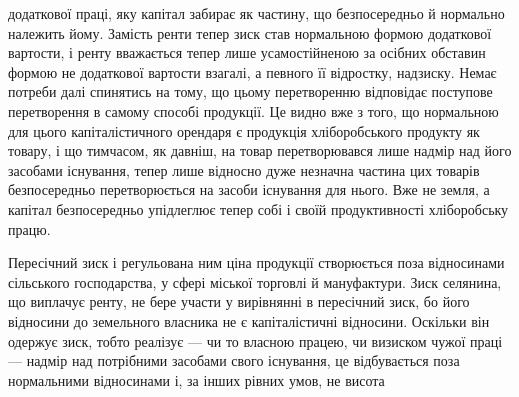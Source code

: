 додаткової праці, яку капітал забирає як частину, що безпосередньо й нормально
належить йому. Замість ренти тепер зиск став нормальною формою додаткової
вартости, і ренту вважається тепер лише усамостійненою за осібних
обставин формою не додаткової вартости взагалі, а певного її відростку, надзиску.
Немає потреби далі спинятись на тому, що цьому перетворенню відповідає
поступове перетворення в самому способі продукції. Це видно вже з того,
що нормальною для цього капіталістичного орендаря є продукція хліборобського
продукту як товару, і що тимчасом, як давніш, на товар перетворювався лише
надмір над його засобами існування, тепер лише відносно дуже незначна частина
цих товарів безпосередньо перетворюється на засоби існування для нього.
Вже не земля, а капітал безпосередньо упідлеглює тепер собі і своїй продуктивності
хліборобську працю.

Пересічний зиск і регульована ним ціна продукції створюється поза відносинами
сільського господарства, у сфері міської торговлі й мануфактури. Зиск
селянина, що виплачує ренту, не бере участи у вирівнянні в пересічний зиск,
бо його відносини до земельного власника не є капіталістичні відносини.
Оскільки він одержує зиск, тобто реалізує — чи то власною працею, чи визиском
чужої праці — надмір над потрібними засобами свого існування, це відбувається
поза нормальними відносинами і, за інших рівних умов, не висота
\parbreak{}  %
